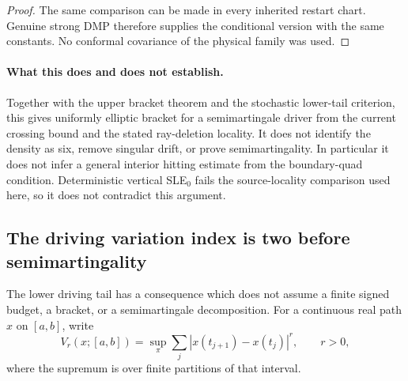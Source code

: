 \documentclass[11pt]{article}
\theoremstyle{definition}\newtheorem{definition}[theorem]{Definition}
\theoremstyle{remark}\newtheorem{remark}[theorem]{Remark}
\begin{document}
\begin{proof}
The same comparison can be made in every inherited restart chart.
Genuine strong DMP therefore supplies the conditional version with
the same constants. No conformal covariance of the physical family
was used.
\end{proof}

\paragraph{What this does and does not establish.}
Together with the upper bracket theorem and the stochastic lower-tail
criterion, this gives uniformly elliptic bracket for a
semimartingale driver from the current crossing bound and the stated
ray-deletion locality. It does not identify the density as six,
remove singular drift, or prove semimartingality. In particular it
does not infer a general interior hitting estimate from the
boundary-quad condition. Deterministic vertical SLE$_0$ fails the
source-locality comparison used here, so it does not contradict this
argument.

\subsection{The driving variation index is two before semimartingality}
\label{sec:driver-variation-index}

The lower driving tail has a consequence which does not assume a
finite signed budget, a bracket, or a semimartingale decomposition.
For a continuous real path $x$ on $[a,b]$, write
\[
 V_r(x;[a,b])=\sup_\pi\sum_j|x(t_{j+1})-x(t_j)|^r,
       \qquad r>0,
 \tag{VI1}
\]
where the supremum is over finite partitions of that interval.
\end{document}
